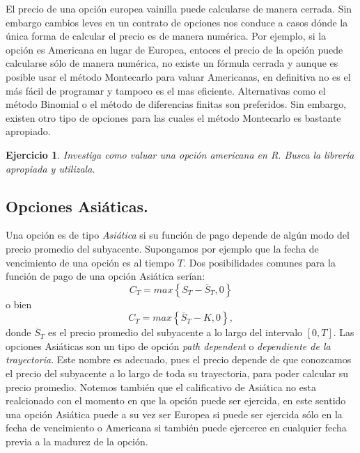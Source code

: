 \documentclass{article}
\newtheorem{ejercicio}{Ejercicio}
\begin{document}
El precio de una opción europea vainilla puede calcularse de manera cerrada. Sin embargo cambios leves en un contrato de opciones nos conduce a casos dónde la única forma de calcular el precio es de manera numérica. Por ejemplo, si la opción es Americana en lugar de Europea, entoces el precio de la opción puede calcularse sólo de manera numérica, no existe un fórmula cerrada y aunque es posible usar el método Montecarlo para valuar Americanas, en definitiva no es el más fácil de programar y tampoco es el mas eficiente. Alternativas como el método Binomial o el método de diferencias finitas son preferidos. Sin embargo,  existen  otro tipo de opciones para las cuales el método Montecarlo es bastante apropiado. 
\begin{ejercicio}
Investiga como valuar una opción americana en R. Busca la librería apropiada y utilizala.    
\end{ejercicio} 
\subsection{Opciones Asiáticas.}
Una opción es de tipo \emph{Asiática} si su función de pago depende de algún modo del precio promedio del subyacente. Supongamos por ejemplo que la fecha de vencimiento de una opción es al tiempo $T$. Dos posibilidades comunes para la función de pago de una opción Asiática serían:
\begin{equation}\label{eq:7}
    C_T= max\left\{S_T-\overline{S}_T, 0\right\}
\end{equation}
o bien
\begin{equation}\label{eq:8}
    C_T= max\left\{\overline{S}_T-K, 0\right\},
\end{equation}
donde $\overline{S}_T$ es el precio promedio del subyacente a lo largo del intervalo $[0, T]$. Las opciones Asiáticas son un tipo de opción \emph{path dependent} o \emph{dependiente de la trayectoria}. Este nombre es adecuado, pues el precio depende de que conozcamos el precio del subyacente a lo largo de toda su trayectoria, para poder calcular su precio promedio. Notemos también que el calificativo de Asiática no esta realcionado con el momento en que la opción puede ser ejercida, en este sentido una opción Asiática puede a su vez ser Europea si puede ser ejercida sólo en la fecha de vencimiento o Americana si también puede ejercerce en cualquier fecha previa a la madurez de la opción.
\end{document}
